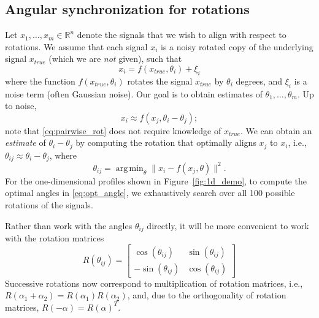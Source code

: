 \documentclass{pnastwo}
\DeclareMathOperator*{\argmin}{arg\,min}
\begin{document}
\begin{article}




\begin{materials}

\section{Angular synchronization for rotations\cite{singer2011angular}}

Let $x_1, \dots, x_m \in \mathbb{R}^n$ denote the signals that we wish to align with respect to rotations. 
%
We assume that each signal $x_i$ is a noisy rotated copy of the underlying signal $x_{true}$ (which we are {\em not} given), such that 
\begin{equation}
x_i = f(x_{true}, \theta_i) + \xi_i
\end{equation}
where the function $f(x_{true}, \theta_i)$ rotates the signal $x_{true}$ by $\theta_i$ degrees, and $\xi_i$ is a noise term (often Gaussian noise). 
%
Our goal is to obtain estimates of $\theta_1, \dots, \theta_m$.
%
Up to noise, 
\begin{equation} \label{eq:pairwise_rot}
x_i \approx f(x_j, \theta_i - \theta_j) ;
\end{equation}
 note that \eqref{eq:pairwise_rot} does not require knowledge of $x_{true}$.
%
We can obtain an {\em estimate} of $\theta_i - \theta_j$ by computing the rotation that optimally aligns $x_j$ to $x_i$, 
i.e., $\theta_{ij} \approx \theta_i - \theta_j$, where
%
\begin{equation} \label{eq:opt_angle}
\theta_{ij} = \argmin_{\theta} \|x_i - f(x_j, \theta)\|^2.
\end{equation}
%
For the one-dimensional profiles shown in Figure~\ref{fig:1d_demo}, to compute the optimal angles in \eqref{eq:opt_angle}, we exhaustively search over all 100 possible rotations of the signals. 

Rather than work with the angles $\theta_{ij}$ directly, it will be more convenient to work with the rotation matrices 
\begin{equation} \label{eq:R_theta}
R(\theta_{ij}) = \begin{bmatrix}
\cos(\theta_{ij}) & \sin(\theta_{ij}) \\
-\sin(\theta_{ij}) & \cos(\theta_{ij})
\end{bmatrix}
\end{equation}
%
Successive rotations now correspond to multiplication of rotation matrices, i.e., 
$R(\alpha_1 + \alpha_2) = R(\alpha_1) R(\alpha_2)$,
and, due to the orthogonality of rotation matrices, $R(-\alpha) = R(\alpha)^T$.


\end{materials}
\end{article}
\end{document}
